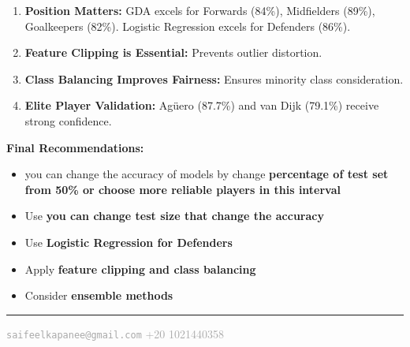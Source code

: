 \documentclass[12pt,a4paper]{article}
\begin{document}
\begin{enumerate}
    \item \textbf{Position Matters:} GDA excels for Forwards (84\%), Midfielders (89\%), Goalkeepers (82\%). Logistic Regression excels for Defenders (86\%).
    \item \textbf{Feature Clipping is Essential:} Prevents outlier distortion.
    \item \textbf{Class Balancing Improves Fairness:} Ensures minority class consideration.
    \item \textbf{Elite Player Validation:} Agüero (87.7\%) and van Dijk (79.1\%) receive strong confidence.
\end{enumerate}

\begin{tcolorbox}[colback=primary!10, colframe=primary, arc=5pt, boxrule=1.5pt]
\textcolor{primary}{\textbf{Final Recommendations:}}
\begin{itemize}
    \item you can change the accuracy of models by change \textbf{percentage of test set from {50\%} or choose more reliable players in this interval }
    \item Use \textbf{you can change test size that change the accuracy }
    \item Use \textbf{Logistic Regression for Defenders}
    \item Apply \textbf{feature clipping and class balancing}
    \item Consider \textbf{ensemble methods}
\end{itemize}
\end{tcolorbox}

\begin{center}
\textcolor{primary}{\rule{0.7\textwidth}{0.5pt}}
\end{center}

\begin{center}
\textcolor{darkgray}{\texttt{saifeelkapanee@gmail.com} \hspace{0.5cm} +20 1021440358}
\end{center}
\end{document}
